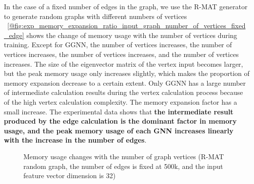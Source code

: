 In the case of a fixed number of edges in the graph, we use the R-MAT generator to generate random graphs with different numbers of vertices
\figurename~\ref{@fig:exp_memory_expansion_ratio_input_graph_number_of_vertices_fixed_edge} shows the change of memory usage with the number of vertices during training.
Except for GGNN, the number of vertices increases, the number of vertices increases, the number of vertices increases,
and the number of vertices increases. The size of the eigenvector matrix of the vertex input becomes larger,
but the peak memory usage only increases slightly, which makes the proportion of memory expansion decrease to a certain extent.
Only GGNN has a large number of intermediate calculation results during the vertex calculation process because of the high vertex calculation complexity.
The memory expansion factor has a small increase. The experimental data shows that \textbf{the intermediate result produced by the edge calculation is the dominant factor
    in memory usage, and the peak memory usage of each GNN increases linearly with the increase in the number of edges}.

\begin{figure}
    \centering
    \caption{Memory usage changes with the number of graph vertices (R-MAT random graph, the number of edges is fixed at 500k, and the input feature vector dimension is 32)}
    \label{fig:exp_memory_expansion_ratio_input_graph_number_of_vertices_fixed_edge}
\end{figure}

